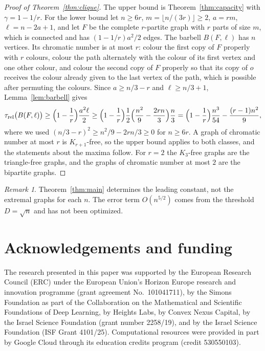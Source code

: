 \documentclass[11pt]{amsart}
\numberwithin{equation}{section}
\theoremstyle{remark}
\newtheorem{remark}[theorem]{Remark}
\newcommand{\trel}{\tau_{\mathrm{rel}}}
\begin{document}
\begin{proof}[Proof of Theorem~\ref{thm:clique}]
The upper bound is Theorem~\ref{thm:capacity} with $\gamma=1-1/r$. For the lower bound let $n\ge6r$, $m=\lfloor n/(3r)\rfloor\ge2$, $a=rm$, $\ell=n-2a+1$, and let $F$ be the complete $r$-partite graph with $r$ parts of size $m$, which is connected and has $(1-1/r)a^2/2$ edges. The barbell $B(F,\ell)$ has $n$ vertices. Its chromatic number is at most $r$: colour the first copy of $F$ properly with $r$ colours, colour the path alternately with the colour of its first vertex and one other colour, and colour the second copy of $F$ properly so that its copy of $o$ receives the colour already given to the last vertex of the path, which is possible after permuting the colours. Since $a\ge n/3-r$ and $\ell\ge n/3+1$, Lemma~\ref{lem:barbell} gives
\[
\trel\bigl(B(F,\ell)\bigr)\ge\Bigl(1-\frac1r\Bigr)\frac{a^2\ell}2\ge\Bigl(1-\frac1r\Bigr)\frac12\Bigl(\frac{n^2}9-\frac{2rn}3\Bigr)\frac n3=\Bigl(1-\frac1r\Bigr)\frac{n^3}{54}-\frac{(r-1)n^2}9,
\]
where we used $(n/3-r)^2\ge n^2/9-2rn/3\ge0$ for $n\ge6r$. A graph of chromatic number at most $r$ is $K_{r+1}$-free, so the upper bound applies to both classes, and the statements about the maxima follow. For $r=2$ the $K_3$-free graphs are the triangle-free graphs, and the graphs of chromatic number at most $2$ are the bipartite graphs.
\end{proof}

\begin{remark}\label{rem:scope}
Theorem~\ref{thm:main} determines the leading constant, not the extremal graphs for each $n$. The error term $O(n^{5/2})$ comes from the threshold $D=\sqrt n$ and has not been optimized.
\end{remark}

\section*{Acknowledgements and funding}
The research presented in this paper was supported by the European Research
Council (ERC) under the European Union's Horizon Europe research and
innovation programme (grant agreement No.~101041711), by the Simons
Foundation as part of the Collaboration on the Mathematical and Scientific
Foundations of Deep Learning, by Heights Labs, by Convex Nexus Capital, by
the Israel Science Foundation (grant number 2258/19), and by the Israel
Science Foundation (ISF Grant 4101/25). Computational resources were
provided in part by Google Cloud through its education credits program
(credit 530550103).
\end{document}

